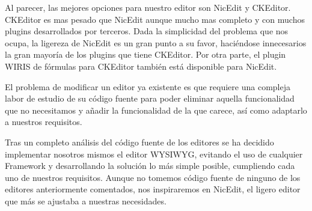 Al parecer, las mejores opciones para nuestro editor son NicEdit y CKEditor. CKEditor es mas pesado que NicEdit aunque mucho mas completo y con muchos plugins desarrollados por terceros. Dada la simplicidad del problema que nos ocupa, la ligereza de NicEdit es un gran punto a su favor, haciéndose innecesarios la gran mayoría de los plugins que tiene CKEditor. Por otra parte, el plugin WIRIS de fórmulas para CKEditor también está disponible para NicEdit. 

El problema de modificar un editor ya existente es que requiere una compleja labor de estudio de su código fuente para poder eliminar aquella funcionalidad que no necesitamos y añadir la funcionalidad de la que carece, así como adaptarlo a nuestros requisitos.  

Tras un completo análisis del código fuente de los editores se ha decidido implementar nosotros mismos el editor WYSIWYG, evitando el uso de cualquier Framework y desarrollando la solución lo más simple posible, cumpliendo cada uno de nuestros requisitos. Aunque no tomemos código fuente de ninguno de los editores anteriormente comentados, nos inspiraremos en NicEdit, el ligero editor que más se ajustaba a nuestras necesidades.



